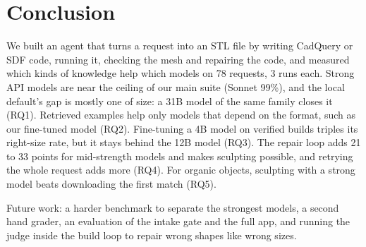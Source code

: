 \section{Conclusion}
\label{sec:conclusion}

We built an agent that turns a request into an STL file by writing CadQuery or SDF code, running it, checking the mesh and repairing the code, and measured which kinds of knowledge help which models on 78 requests, 3 runs each.
Strong API models are near the ceiling of our main suite (Sonnet 99\%), and the local default's gap is mostly one of size: a 31B model of the same family closes it (RQ1).
Retrieved examples help only models that depend on the format, such as our fine-tuned model (RQ2).
Fine-tuning a 4B model on verified builds triples its right-size rate, but it stays behind the 12B model (RQ3).
The repair loop adds 21 to 33 points for mid-strength models and makes sculpting possible, and retrying the whole request adds more (RQ4).
For organic objects, sculpting with a strong model beats downloading the first match (RQ5).

Future work: a harder benchmark to separate the strongest models, a second hand grader, an evaluation of the intake gate and the full app, and running the judge inside the build loop to repair wrong shapes like wrong sizes.
